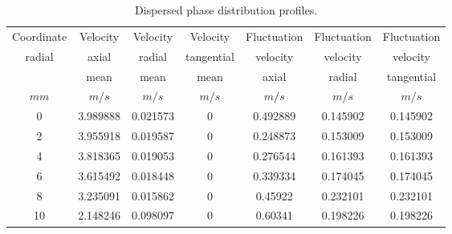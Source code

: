 \begin{itemize}
\begin{table}[H]
   \begin{center}
      \begin{tabular}{|c|c|c|c|c|c|c|} \hline
         Coordinate  & Velocity    & Velocity    & Velocity   &
         Fluctuation & Fluctuation & Fluctuation                                               \\
         radial      & axial       & radial      & tangential & velocity
                     & velocity    & velocity                                                  \\
                     & mean        & mean        & mean       & axial
                     & radial      & tangential                                                \\
         $mm$        & $m/s$       & $m/s$       & $m/s$      & $m/s$    & $m/s$    & $m/s$    \\ \hline
         0           & 3.989888    & 0.021573    & 0          & 0.492889 & 0.145902 & 0.145902 \\ \hline
         2           & 3.955918    & 0.019587    & 0          & 0.248873 & 0.153009 & 0.153009 \\ \hline
         4           & 3.818365    & 0.019053    & 0          & 0.276544 & 0.161393 & 0.161393 \\ \hline
         6           & 3.615492    & 0.018448    & 0          & 0.339334 & 0.174045 & 0.174045 \\ \hline
         8           & 3.235091    & 0.015862    & 0          & 0.45922  & 0.232101 & 0.232101 \\ \hline
         10          & 2.148246    & 0.098097    & 0          & 0.60341  & 0.198226 & 0.198226 \\ \hline
      \end{tabular}
   \end{center}
   \caption{Dispersed phase distribution profiles.}
   \label{CL_part}
\end{table}


\end{itemize}
